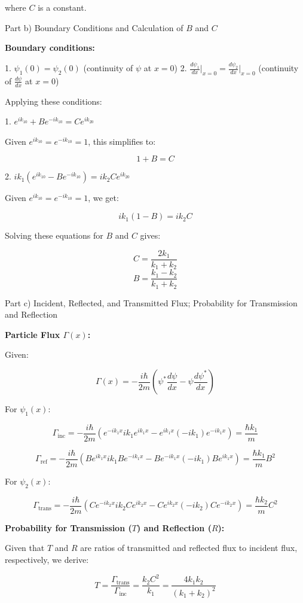 \documentclass[a4paper,11pt]{article}
\begin{document}
where \(C\) is a constant.

Part b) Boundary Conditions and Calculation of \(B\) and \(C\)

\textbf{Boundary conditions:}

1. \(\psi_1(0) = \psi_2(0)\) (continuity of \(\psi\) at \(x=0\))
2. \(\frac{d\psi_1}{dx}\bigg|_{x=0} = \frac{d\psi_2}{dx}\bigg|_{x=0}\) (continuity of \(\frac{d\psi}{dx}\) at \(x=0\))

Applying these conditions:

1. \(e^{ik_10} + Be^{-ik_10} = Ce^{ik_20}\)

Given \(e^{ik_10} = e^{-ik_10} = 1\), this simplifies to:

\[
1 + B = C
\]

2. \(ik_1(e^{ik_10} - Be^{-ik_10}) = ik_2Ce^{ik_20}\)

Given \(e^{ik_10} = e^{-ik_10} = 1\), we get:

\[
ik_1(1 - B) = ik_2C
\]

Solving these equations for \(B\) and \(C\) gives:

\[
C = \frac{2k_1}{k_1+k_2}
\]
\[
B = \frac{k_1-k_2}{k_1+k_2}
\]

Part c) Incident, Reflected, and Transmitted Flux; Probability for Transmission and Reflection

\textbf{Particle Flux \(\Gamma(x)\):}

Given:

\[
\Gamma(x) = -\frac{i\hbar}{2m} \left(\psi^{*}\frac{d\psi}{dx} - \psi\frac{d\psi^{*}}{dx} \right)
\]

For \(\psi_1(x)\):

\[
\Gamma_{\text{inc}} = -\frac{i\hbar}{2m} \left( e^{-ik_1x}ik_1e^{ik_1x} - e^{ik_1x}(-ik_1)e^{-ik_1x} \right) = \frac{\hbar k_1}{m}
\]

\[
\Gamma_{\text{ref}} = -\frac{i\hbar}{2m} \left( Be^{ik_1x}ik_1Be^{-ik_1x} - Be^{-ik_1x}(-ik_1)Be^{ik_1x} \right) = \frac{\hbar k_1}{m}B^2
\]

For \(\psi_2(x)\):

\[
\Gamma_{\text{trans}} = -\frac{i\hbar}{2m} \left( Ce^{-ik_2x}ik_2Ce^{ik_2x} - Ce^{ik_2x}(-ik_2)Ce^{-ik_2x} \right) = \frac{\hbar k_2}{m}C^2
\]

\textbf{Probability for Transmission (\(T\)) and Reflection (\(R\)):}

Given that \(T\) and \(R\) are ratios of transmitted and reflected flux to incident flux, respectively, we derive:

\[
T = \frac{\Gamma_{\text{trans}}}{\Gamma_{\text{inc}}} = \frac{k_2C^2}{k_1} = \frac{4k_1k_2}{(k_1+k_2)^2}
\]
\end{document}
